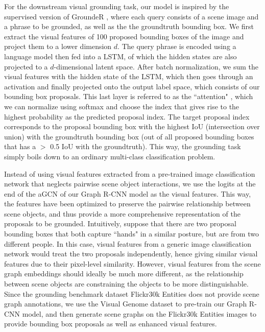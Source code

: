 For the downstream visual grounding task, our model is inspired by the supervised version of GroundeR \cite{rohrbach2016grounding}, where each query consists of a scene image and a phrase to be grounded, as well as the the groundtruth bounding box. We first extract the visual features of 100 proposed bounding boxes of the image and project them to a lower dimension $d$. The query phrase is encoded using a language model then fed into a LSTM, of which the hidden states are also projected to a $d$-dimensional latent space. After batch normalization, we sum the visual features with the hidden state of the LSTM, which then goes through an activation and finally projected onto the output label space, which consists of our bounding box proposals. This last layer is referred to as the ``attention"  \cite{rohrbach2016grounding} , which we can normalize using softmax and choose the index that gives rise to the highest probability as the predicted proposal index. The target proposal index corresponds to the proposal bounding box with the highest IoU (intersection over union) with the groundtruth bounding box (out of all proposed bounding boxes that has a $>$ 0.5 IoU with the groundtruth). This way, the grounding task simply boils down to an ordinary multi-class classification problem.

Instead of using visual features extracted from a pre-trained image classification network that neglects pairwise scene object interactions, we use the logits at the end of the aGCN of our Graph R-CNN model as the visual features. This way, the features have been optimized to preserve the pairwise relationship between scene objects, and thus provide a more comprehensive representation of the proposals to be grounded. Intuitively, suppose that there are two proposal bounding boxes that both capture ``hands" in a similar posture, but are from two different people. In this case, visual features from a generic image classification network would treat the two proposals independently, hence giving similar visual features due to their pixel-level similarity. However, visual features from the scene graph embeddings should ideally be much more different, as the relationship between scene objects are constraining the objects to be more distinguishable. Since the grounding benchmark dataset Flickr30k Entities \cite{plummer2015flickr30k} does not provide scene graph annotations, we use the Visual Genome dataset \cite{krishna2017visual} to pre-train our Graph R-CNN model, and then generate scene graphs on the Flickr30k Entities images to provide bounding box proposals as well as enhanced visual features. 
